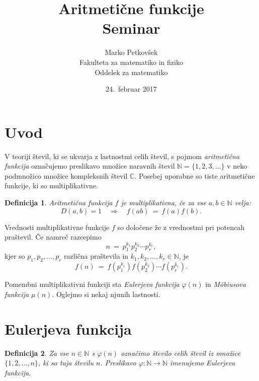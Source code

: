 \documentclass[a4paper,12pt]{article}
\title{Aritmetične funkcije \\ 
\Large Seminar}
\author{Marko Petkov\v sek \\
Fakulteta za matematiko in fiziko \\
Oddelek za matematiko}
\date{24.\ februar 2017}
\def\N{\mathbb{N}} %
\def\C{\mathbb{C}} %
\newtheorem{definicija}{Definicija}
\begin{document}


\maketitle



\section{Uvod}

V teoriji števil, ki se ukvarja z lastnostmi celih števil, s pojmom {\em aritmetična funkcija}
označujemo preslikavo množice naravnih števil $\N = \{1,2,3,\ldots\}$ v neko podmnožico
množice kompleksnih števil $\C$.
Posebej uporabne so tiste aritmetične funkcije, ki so multiplikativne.

\begin{definicija}
Aritmetična funkcija $f$ je {\em multiplikativna}, če za vse $a, b \in \N$ velja:
\[
D(a, b) = 1 \quad \Longrightarrow\quad f(ab)\ =\ f(a)f(b).
\]
\end{definicija}

Vrednosti multiplikativne funkcije $f$  so določene že z vrednostmi pri
potencah praštevil. Če namreč razcepimo 
\[
n\ =\ p_1^{k_1} p_2^{k_2} \cdots p_r^{k_r},
\]
kjer so $p_1, p_2, \ldots, p_r$ različna praštevila in $k_1, k_2, \ldots, k_r \in \N$, je
\[
f(n)\ =\ f\!\left(p_1^{k_1}\right) f\!\left(p_2^{k_2}\right) \cdots f\!\left(p_r^{k_r}\right).
\]

Pomembni multiplikativni funkciji sta {\em Eulerjeva funkcija\/} $\varphi(n)$ in {\em M\"obiusova funkcija\/} $\mu(n)$. Oglejmo si nekaj njunih lastnosti.



\section{Eulerjeva funkcija}


\begin{definicija}
Za vse $n \in \N$ s $\varphi(n)$ označimo število 
celih števil iz množice $\{1, 2, \ldots, n\}$, ki so tuja številu $n$.
Preslikavo $\varphi: \N \to \N$ imenujemo \em{Eulerjeva funkcija}.
\end{definicija}
\end{document}
